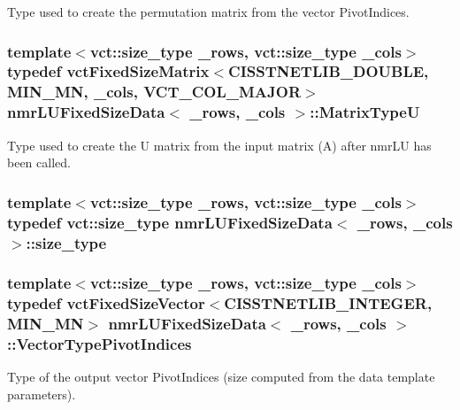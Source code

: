 Type used to create the permutation matrix from the vector Pivot\-Indices. \hypertarget{classnmr_l_u_fixed_size_data_af66a67d9ec3e76d9d63dc36cfd969896}{
\subsubsection[{Matrix\-Type\-U}]{\setlength{\rightskip}{0pt plus 5cm}template$<$vct\-::size\-\_\-type \-\_\-rows, vct\-::size\-\_\-type \-\_\-cols$>$ typedef {\bf vct\-Fixed\-Size\-Matrix}$<$C\-I\-S\-S\-T\-N\-E\-T\-L\-I\-B\-\_\-\-D\-O\-U\-B\-L\-E, {\bf M\-I\-N\-\_\-\-M\-N}, \-\_\-cols, {\bf V\-C\-T\-\_\-\-C\-O\-L\-\_\-\-M\-A\-J\-O\-R}$>$ {\bf nmr\-L\-U\-Fixed\-Size\-Data}$<$ \-\_\-rows, \-\_\-cols $>$\-::{\bf Matrix\-Type\-U}}}\label{classnmr_l_u_fixed_size_data_af66a67d9ec3e76d9d63dc36cfd969896}
Type used to create the U matrix from the input matrix (A) after nmr\-L\-U has been called. \hypertarget{classnmr_l_u_fixed_size_data_a082f0e46bc61303a725f08a300ff4276}{
\subsubsection[{size\-\_\-type}]{\setlength{\rightskip}{0pt plus 5cm}template$<$vct\-::size\-\_\-type \-\_\-rows, vct\-::size\-\_\-type \-\_\-cols$>$ typedef {\bf vct\-::size\-\_\-type} {\bf nmr\-L\-U\-Fixed\-Size\-Data}$<$ \-\_\-rows, \-\_\-cols $>$\-::{\bf size\-\_\-type}}}\label{classnmr_l_u_fixed_size_data_a082f0e46bc61303a725f08a300ff4276}
\hypertarget{classnmr_l_u_fixed_size_data_aa44bd56146e161d7b56d7f2001153ccb}{
\subsubsection[{Vector\-Type\-Pivot\-Indices}]{\setlength{\rightskip}{0pt plus 5cm}template$<$vct\-::size\-\_\-type \-\_\-rows, vct\-::size\-\_\-type \-\_\-cols$>$ typedef {\bf vct\-Fixed\-Size\-Vector}$<$C\-I\-S\-S\-T\-N\-E\-T\-L\-I\-B\-\_\-\-I\-N\-T\-E\-G\-E\-R, {\bf M\-I\-N\-\_\-\-M\-N}$>$ {\bf nmr\-L\-U\-Fixed\-Size\-Data}$<$ \-\_\-rows, \-\_\-cols $>$\-::{\bf Vector\-Type\-Pivot\-Indices}}}\label{classnmr_l_u_fixed_size_data_aa44bd56146e161d7b56d7f2001153ccb}
Type of the output vector Pivot\-Indices (size computed from the data template parameters). 

